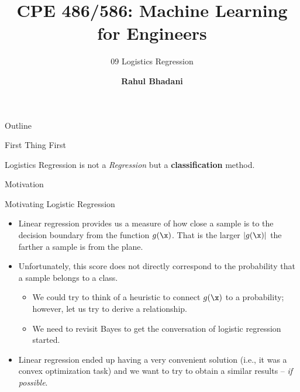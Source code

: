\documentclass[aspectratio=169,xcolor=dvipsnames,svgnames,x11names,fleqn]{beamer}
\title[CPE 486/586: Machine Learning]{CPE 486/586: Machine Learning for Engineers} %
\subtitle{09 Logistics Regression}
\author[Rahul Bhadani] {{\Large \textbf{Rahul Bhadani}}}
\institute[UAH] %
{
    Electrical \& Computer Engineering,  The University of Alabama in Huntsville
}
\date
\begin{document}
\begin{frame}
    \titlepage
\end{frame}

\begin{frame}{Outline}
    \backgroundtableofcontents
\end{frame}



 

\begin{frame}{First Thing First}
    
    \begin{center}
        \Large
        Logistics Regression is not a \textit{Regression} but a \textbf{classification} method.
    \end{center}
    
\end{frame}
\begin{sectionframe}{\faYelp}{Motivation}
\end{sectionframe}

\begin{frame}{Motivating Logistic Regression}

    \begin{itemize}
        \item Linear regression provides us a measure of how close a sample is to the decision boundary from the function $g(\x)$. That is the larger $|g(\x)|$ the farther a sample is from the plane. 
        \item Unfortunately, this score does not directly correspond to the probability that a sample belongs to a class. 
        \begin{itemize}
            \item We could try to think of a heuristic to connect $g(\x)$ to a probability; however, let us try to derive a relationship. 
            \item We need to revisit Bayes to get the conversation of logistic regression started.
        \end{itemize}
        \item Linear regression ended up having a very convenient solution (i.e., it was a convex optimization task) and we want to try to obtain a similar results -- {\em if possible}. 
    \end{itemize}
    
    
    \end{frame}
    
\end{document}
